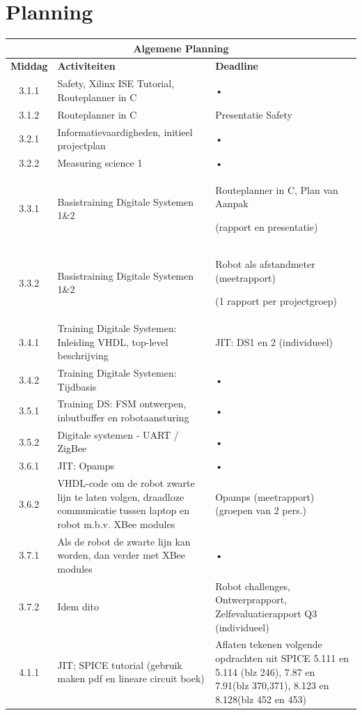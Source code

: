 \documentclass[11pt]{article}
\begin{document}
\newpage
\section{Planning}
\begin{adjustbox}{width=\textwidth,totalheight=\textheight,keepaspectratio}

\begin{tabular}{|c|p{10cm}|p{8cm}|}
\hline 
\multicolumn{3}{|c|}{\textbf{Algemene Planning}} \\ 
\hline 
\textbf{Middag} & \textbf{Activiteiten} & \textbf{Deadline} \\ 
\hline 
3.1.1 & Safety, Xilinx ISE Tutorial, Routeplanner in C & • \\ 
\hline 
3.1.2 & Routeplanner in C & Presentatie Safety \\ 
\hline 
3.2.1 & Informatievaardigheden, initieel projectplan & • \\ 
\hline 
3.2.2 & Measuring science 1 & • \\ 
\hline 
3.3.1 & Basistraining Digitale Systemen 1\&2 & Routeplanner in C, Plan van Aanpak 

(rapport en presentatie) \\ 
\hline 
3.3.2 & Basistraining Digitale Systemen 1\&2 & Robot als afstandmeter (meetrapport) 

(1 rapport per projectgroep)\\ 
\hline 
3.4.1 & Training Digitale Systemen: Inleiding VHDL, top-level beschrijving & JIT: DS1 en 2 (individueel)\\ 
\hline 
3.4.2 & Training Digitale Systemen: Tijdbasis & • \\ 
\hline 
3.5.1 & Training DS: FSM ontwerpen, inbutbuffer en robotaansturing & • \\ 
\hline 
3.5.2 & Digitale systemen - UART / ZigBee & • \\ 
\hline 
3.6.1 & JIT: Opamps & • \\ 
\hline 
3.6.2 & VHDL-code om de robot zwarte lijn te laten volgen, draadloze communicatie tussen laptop en robot m.b.v. XBee modules & Opamps (meetrapport) (groepen van 2 pers.)\\ 
\hline 
3.7.1 & Als de robot de zwarte lijn kan worden, dan verder met XBee modules & • \\ 
\hline 
3.7.2 & Idem dito & Robot challenges, Ontwerprapport, Zelfevaluatierapport Q3 (individueel)\\ 
\hline
4.1.1 & JIT; SPICE tutorial (gebruik maken pdf en lineare circuit boek) & Aflaten tekenen volgende opdrachten uit SPICE 5.111 en 5.114 (blz 246), 7.87 en 7.91(blz 370,371), 8.123 en 8.128(blz 452 en 453) 


\end{tabular}
\end{adjustbox}
\end{document}

